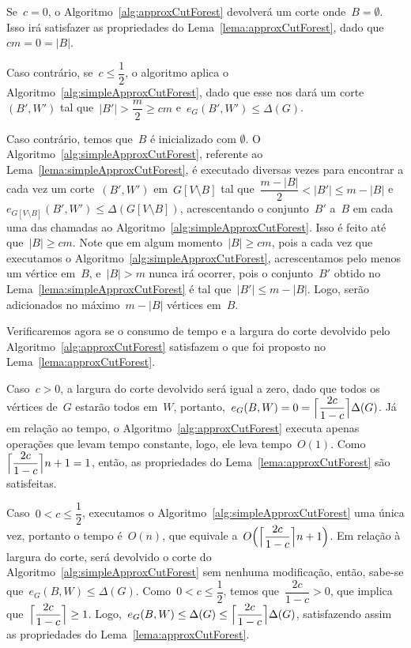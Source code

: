 	Se~$c=0$, o Algoritmo~\ref{alg:approxCutForest} devolverá
	um corte onde~$B=\emptyset$. Isso irá satisfazer as 
	propriedades do Lema~\ref{lema:approxCutForest}, dado 
	que~$cm=0=|B|$.

	Caso contrário, se~$c \le \dfrac{1}{2}$, o algoritmo aplica o 
	Algoritmo~\ref{alg:simpleApproxCutForest}, dado que esse 
	nos dará um corte~$(B',W')$ tal 
	que~$|B'|>\dfrac{m}{2}\ge cm$ e~${e_G(B',W')\le \Delta(G)}$.

	Caso contrário, temos que~$B$ é inicializado com $\emptyset$.
	O Algoritmo~\ref{alg:simpleApproxCutForest}, 
	referente ao Lema~\ref{lema:simpleApproxCutForest}, é
	executado diversas vezes para encontrar a cada vez
	um corte~$(B',W')$ em~${G[V\setminus B]}$ 
	tal que~${\dfrac{m-|B|}{2}<|B'|\le m-|B|}$ 
	e~${e_{G[V\setminus B]}(B',W')\le\Delta(G[V\setminus B])}$, 
	acrescentando o 
	conjunto~$B'$ a~$B$ em cada uma das chamadas ao 
	Algoritmo~\ref{alg:simpleApproxCutForest}.
	Isso é feito até que~${|B|\ge cm}$.
	Note que em algum momento~$|B|\ge cm$, pois a 
	cada vez que executamos o 
	Algoritmo~\ref{alg:simpleApproxCutForest}, acrescentamos pelo 
	menos um vértice em~$B$, e~${|B|>m}$ nunca irá ocorrer, pois o 
	conjunto~$B'$ obtido no Lema~\ref{lema:simpleApproxCutForest} 
	é tal que~$|B'|\le m-|B|$. Logo, serão adicionados no 
	máximo~${m-|B|}$ vértices em~$B$.
	
	\bigskip
	
	Verificaremos agora se o consumo de tempo e a largura do corte
	devolvido pelo Algoritmo~\ref{alg:approxCutForest} satisfazem
	o que foi proposto no Lema~\ref{lema:approxCutForest}.
	
	Caso~${c>0}$, a largura do corte devolvido será igual a zero,
	dado que todos os vértices de~$G$ estarão todos em~$W$,
	portanto,~${e_G(B,W)=0=\ceil[\Big]{\dfrac{2c}{1-c}} \Delta(G)}$.
	Já em relação ao tempo, o Algoritmo~\ref{alg:approxCutForest}
	executa apenas operações que levam tempo constante, logo, ele
	leva tempo~$O(1)$. 
	Como~$\ceil[\Big]{\dfrac{2c}{1-c}} n+1 = 1$, então,
	as propriedades do Lema~\ref{lema:approxCutForest} são
	satisfeitas.

	Caso~$0<c\le \dfrac{1}{2}$, executamos o
	Algoritmo~\ref{alg:simpleApproxCutForest} uma única vez, 
	portanto o tempo é~$O(n)$, que equivale 
	a~${O\Big(\ceil[\Big]{\dfrac{2c}{1-c}} n+1\Big)}$.
	Em relação à largura do corte, será devolvido o corte do 
	Algoritmo~\ref{alg:simpleApproxCutForest} sem nenhuma 
	modificação, então, sabe-se que~${e_G(B,W)\le \Delta(G)}$.
	Como~${0<c\le\dfrac{1}{2}}$, temos que~${\dfrac{2c}{1-c}>0}$, 
	que implica que~${\ceil[\Big]{ \dfrac{2c}{1-c}}\ge 1}$.
	Logo,~${e_G(B,W)\le\Delta(G)\le \ceil[\Big]{\dfrac{2c}{1-c}}
	\Delta(G)}$, 
	satisfazendo assim as propriedades do 
	Lema~\ref{lema:approxCutForest}.

